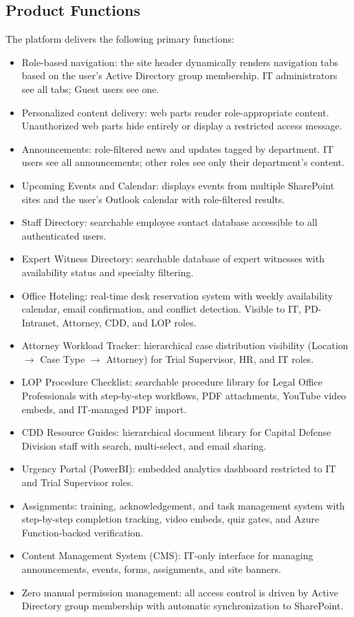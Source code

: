 \documentclass[12pt]{article}
\begin{document}
\subsection{Product Functions}

The platform delivers the following primary functions:

\begin{itemize}[leftmargin=*]
\item  Role-based navigation: the site header dynamically renders navigation tabs based on the user's Active Directory group membership. IT administrators see all tabs; Guest users see one.
\item  Personalized content delivery: web parts render role-appropriate content. Unauthorized web parts hide entirely or display a restricted access message.
\item  Announcements: role-filtered news and updates tagged by department. IT users see all announcements; other roles see only their department's content.
\item  Upcoming Events and Calendar: displays events from multiple SharePoint sites and the user's Outlook calendar with role-filtered results.
\item  Staff Directory: searchable employee contact database accessible to all authenticated users.
\item  Expert Witness Directory: searchable database of expert witnesses with availability status and specialty filtering.
\item  Office Hoteling: real-time desk reservation system with weekly availability calendar, email confirmation, and conflict detection. Visible to IT, PD-Intranet, Attorney, CDD, and LOP roles.
\end{itemize}

\begin{itemize}[leftmargin=*]
\item  Attorney Workload Tracker: hierarchical case distribution visibility (Location $\rightarrow$ Case Type $\rightarrow$ Attorney) for Trial Supervisor, HR, and IT roles.
\item  LOP Procedure Checklist: searchable procedure library for Legal Office Professionals with step-by-step workflows, PDF attachments, YouTube video embeds, and IT-managed PDF import.
\item  CDD Resource Guides: hierarchical document library for Capital Defense Division staff with search, multi-select, and email sharing.
\item  Urgency Portal (PowerBI): embedded analytics dashboard restricted to IT and Trial Supervisor roles.
\item  Assignments: training, acknowledgement, and task management system with step-by-step completion tracking, video embeds, quiz gates, and Azure Function-backed verification.
\item  Content Management System (CMS): IT-only interface for managing announcements, events, forms, assignments, and site banners.
\item  Zero manual permission management: all access control is driven by Active Directory group membership with automatic synchronization to SharePoint.
\end{itemize}
\end{document}

